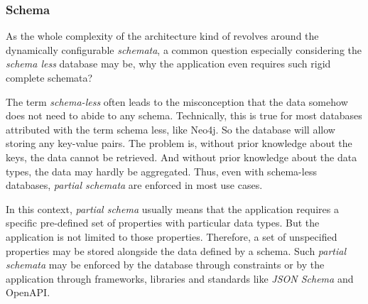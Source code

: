 \subsubsection{Schema}
As the whole complexity of the architecture kind of revolves around the dynamically configurable \emph{schemata}, a common question especially considering the \emph{schema less} database may be, why the application even requires such rigid complete schemata?\par
The term \emph{schema-less} often leads to the misconception that the data somehow does not need to abide to any schema. Technically, this is true for most databases attributed with the term schema less, like Neo4j. So the database will allow storing any key-value pairs. The problem is, without prior knowledge about the keys, the data cannot be retrieved. And without prior knowledge about the data types, the data may hardly be aggregated. Thus, even with schema-less databases, \emph{partial schemata} are enforced in most use cases.\par
In this context, \emph{partial schema} usually means that the application requires a specific pre-defined set of properties with particular data types. But the application is not limited to those properties. Therefore, a set of unspecified properties may be stored alongside the data defined by a schema. Such \emph{partial schemata} may be enforced by the database through constraints or by the application through frameworks, libraries and standards like \emph{JSON Schema} \cite{JsonSchema} and OpenAPI.\\

